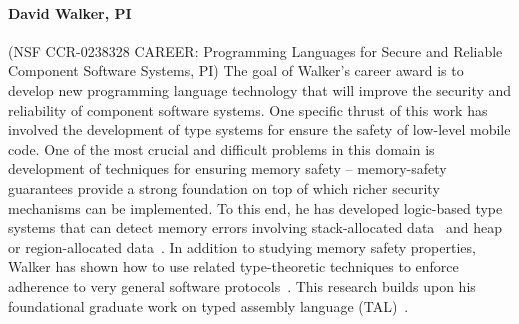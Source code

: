 \documentclass[11pt]{article}
\begin{document}


%

\paragraph*{David Walker, PI} (NSF CCR-0238328 CAREER: Programming Languages for Secure and Reliable Component Software
Systems, PI)
The goal of Walker's career award is to develop new programming language
technology that will improve the security and reliability of component software systems.  
One specific thrust of this work has involved the development of
type systems for ensure the safety of low-level mobile code.
One of the most crucial and difficult problems in this domain
is development of techniques for ensuring memory safety --
memory-safety guarantees 
provide a strong foundation on top of  which
richer security mechanisms can be implemented.  
To this end, he has developed
logic-based type systems that can detect memory errors involving
stack-allocated data~\cite{ahmed+:stack,jia+:stack} and heap or region-allocated
data~\cite{ahmed+:hierarchical-storage}.  In addition to studying memory safety
properties, Walker has shown how to use related type-theoretic techniques
to enforce adherence to very general software
protocols~\cite{mandelbaum+:refinements}.  This research builds 
upon his foundational graduate work on typed assembly language 
(TAL)~\cite{morrisett+:tal,morrisett+:journal-stal}.
\end{document}
